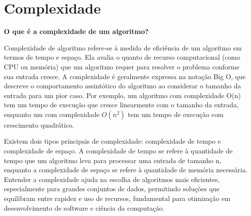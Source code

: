\section{Complexidade}
\textbf{O que é a complexidade de um algoritmo?}

Complexidade de algoritmo refere-se à medida de eficiência de um algoritmo em termos de tempo e espaço. Ela avalia o quanto de recurso computacional (como CPU ou memória) que um algoritmo requer para resolver o problema conforme sua entrada cresce. A complexidade é geralmente expressa na notação Big O, que descreve o comportamento assintótico do algoritmo ao considerar o tamanho da entrada para um pior caso. Por exemplo, um algoritmo com complexidade O(n) tem um tempo de execução que cresce linearmente com o tamanho da entrada, enquanto um com complexidade $O(n^2)$ tem um tempo de execução com crescimento quadrático.

Existem dois tipos principais de complexidade: complexidade de tempo e complexidade de espaço. A complexidade de tempo se refere à quantidade de tempo que um algoritmo leva para processar uma entrada de tamanho n, enquanto a complexidade de espaço se refere à quantidade de memória necessária. Entender a complexidade ajuda na escolha de algoritmos mais eficientes, especialmente para grandes conjuntos de dados, permitindo soluções que equilibram entre rapidez e uso de recursos, fundamental para otimização em desenvolvimento de software e ciência da computação.









